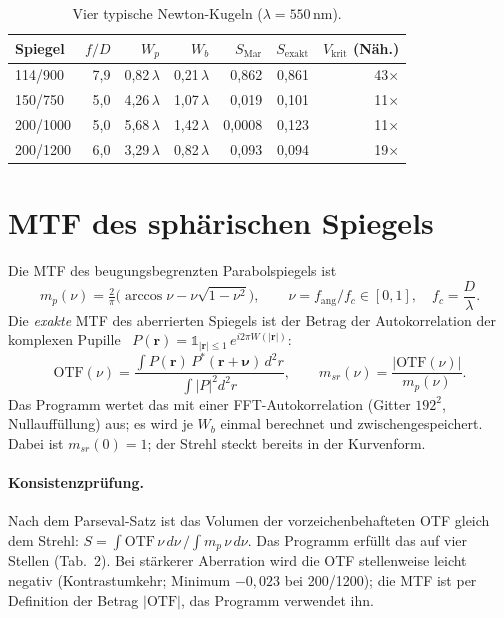\documentclass[11pt,a4paper]{article}
\newcommand{\Vkrit}{V_{\mathrm{krit}}}
\begin{document}
\begin{table}[ht]
\centering
\begin{tabular}{lrrrrrr}
\toprule
Spiegel & $f/D$ & $W_p$ & $W_b$ & $S_{\mathrm{Mar}}$ & $S_{\mathrm{exakt}}$ & $\Vkrit$ (Näh.)\\
\midrule
114/900 & 7,9 & 0,82\,$\lambda$ & 0,21\,$\lambda$ & 0,862 & 0,861 & 43$\times$\\
150/750 & 5,0 & 4,26\,$\lambda$ & 1,07\,$\lambda$ & 0,019 & 0,101 & 11$\times$\\
200/1000 & 5,0 & 5,68\,$\lambda$ & 1,42\,$\lambda$ & 0,0008 & 0,123 & 11$\times$\\
200/1200 & 6,0 & 3,29\,$\lambda$ & 0,82\,$\lambda$ & 0,093 & 0,094 & 19$\times$\\
\bottomrule
\end{tabular}
\caption{Vier typische Newton-Kugeln ($\lambda=550$\,nm).}
\end{table}

\section{MTF des sphärischen Spiegels}
Die MTF des beugungsbegrenzten Parabolspiegels ist
\begin{equation}
m_p(\nu)=\tfrac{2}{\pi}\big(\arccos\nu-\nu\sqrt{1-\nu^2}\big),\qquad \nu=f_{\mathrm{ang}}/f_c\in[0,1],\quad f_c=\frac{D}{\lambda}.
\end{equation}
Die \emph{exakte} MTF des aberrierten Spiegels ist der Betrag der Autokorrelation der komplexen Pupille~\cite{born} $P(\mathbf r)=\mathbb 1_{|\mathbf r|\le1}\,e^{i2\pi W(|\mathbf r|)}$:
\begin{equation}
\mathrm{OTF}(\nu)=\frac{\int P(\mathbf r)\,P^*(\mathbf r+\boldsymbol\nu)\,d^2r}{\int|P|^2d^2r},\qquad m_{sr}(\nu)=\frac{|\mathrm{OTF}(\nu)|}{m_p(\nu)}.
\end{equation}
Das Programm wertet das mit einer FFT-Autokorrelation (Gitter $192^2$, Nullauffüllung) aus; es wird je $W_b$ einmal berechnet und zwischengespeichert. Dabei ist $m_{sr}(0)=1$; der Strehl steckt bereits in der Kurvenform.

\paragraph{Konsistenzprüfung.} Nach dem Parseval-Satz ist das Volumen der vorzeichenbehafteten OTF gleich dem Strehl: $S=\int\mathrm{OTF}\,\nu\,d\nu\,/\!\int m_p\,\nu\,d\nu$. Das Programm erfüllt das auf vier Stellen (Tab.~2). Bei stärkerer Aberration wird die OTF stellenweise leicht negativ (Kontrastumkehr; Minimum $-0{,}023$ bei 200/1200); die MTF ist per Definition der Betrag $|\mathrm{OTF}|$, das Programm verwendet ihn.
\end{document}
